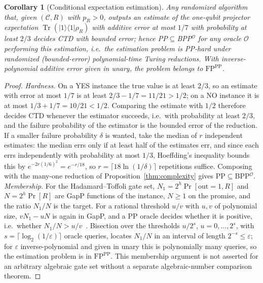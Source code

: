 \documentclass[aps,prx,reprint,superscriptaddress,nobibnotes,longbibliography]{revtex4-2}
\newtheorem{corollary}{Corollary}
\theoremstyle{remark}
\newcommand{\Tr}{\operatorname{Tr}}
\begin{document}
\begin{corollary}[Conditional expectation estimation]
Any randomized algorithm that, given $(\mathcal C,R)$ with $p_R>0$, outputs an estimate of the one-qubit projector expectation $\Tr(|1\rangle\langle1|\rho_R)$ with additive error at most $1/7$ with probability at least $2/3$ decides CTD with bounded error; hence PP$\subseteq$BPP$^{\mathcal O}$ for any oracle $\mathcal O$ performing this estimation, i.e.\ the estimation problem is PP-hard under randomized (bounded-error) polynomial-time Turing reductions.  With inverse-polynomial additive error given in unary, the problem belongs to $\mathrm{FP}^{\mathrm{PP}}$.
\end{corollary}

\begin{proof}
\emph{Hardness.}  On a YES instance the true value is at least $2/3$, so an estimate with error at most $1/7$ is at least $2/3-1/7=11/21>1/2$; on a NO instance it is at most $1/3+1/7=10/21<1/2$.  Comparing the estimate with $1/2$ therefore decides CTD whenever the estimator succeeds, i.e.\ with probability at least $2/3$, and the failure probability of the estimator is the bounded error of the reduction.  If a smaller failure probability $\delta$ is wanted, take the median of $r$ independent estimates: the median errs only if at least half of the estimates err, and since each errs independently with probability at most $1/3$, Hoeffding's inequality bounds this by $e^{-2r(1/6)^2}=e^{-r/18}$, so $r=\lceil18\ln(1/\delta)\rceil$ repetitions suffice.  Composing with the many-one reduction of Proposition~\ref{thm:complexity} gives PP$\subseteq$BPP$^{\mathcal O}$.  \emph{Membership.}  For the Hadamard--Toffoli gate set, $N_1=2^h\Pr[\mathrm{out}=1,R]$ and $N=2^h\Pr[R]$ are GapP functions of the instance, $N\ge1$ on the promise, and the ratio $N_1/N$ is the target.  For a rational threshold $u/v$ with $u,v$ of polynomial size, $vN_1-uN$ is again in GapP, and a PP oracle decides whether it is positive, i.e.\ whether $N_1/N>u/v$~\cite{Fenner1994}.  Bisection over the thresholds $u/2^s$, $u=0,\ldots,2^s$, with $s=\lceil\log_2(1/\varepsilon)\rceil$ oracle queries, locates $N_1/N$ in an interval of length $2^{-s}\le\varepsilon$; for $\varepsilon$ inverse-polynomial and given in unary this is polynomially many queries, so the estimation problem is in $\mathrm{FP}^{\mathrm{PP}}$.  This membership argument is not asserted for an arbitrary algebraic gate set without a separate algebraic-number comparison theorem.
\end{proof}
\end{document}

